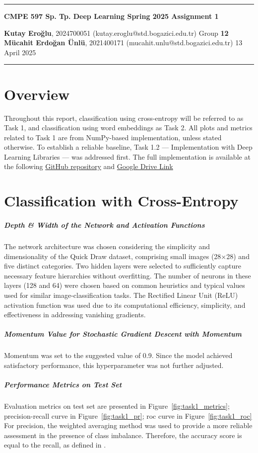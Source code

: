 \documentclass[10pt,a4paper,twoside]{article}
\begin{document}
\begin{center}
\hrule

\vspace{.4cm}
{\bf {\Huge CMPE 597 Sp. Tp. Deep Learning Spring 2025 Assignment 1}}
\vspace{.2cm}
\end{center}
{\bf Kutay Eroğlu}, 2024700051 (kutay.eroglu@std.bogazici.edu.tr)  \hspace{\fill} Group {\bf 12} \\
{\bf Mücahit Erdoğan Ünlü}, 2021400171 (mucahit.unlu@std.bogazici.edu.tr) \hspace{\fill} 13 April 2025 \\
\hrule

\section{Overview}
Throughout this report, classification using cross-entropy will be referred to as Task 1, and classification using word embeddings as Task 2. All plots and metrics related to Task 1 are from NumPy-based implementation, unless stated otherwise.
To establish a reliable baseline, Task 1.2 — Implementation with Deep Learning Libraries — was addressed first. The full implementation is available at the following \href{https://github.com/kutayeroglu/deep-learning}{GitHub repository} and \href{https://drive.google.com/file/d/1zl6N5mgoxoI37qVwYcb3n37ssTL8Q76D/view?usp=sharing}{Google Drive Link}


\section{Classification with Cross-Entropy}
\subparagraph{Depth \& Width of the Network and Activation Functions}
The network architecture was chosen considering the simplicity and dimensionality of the Quick Draw dataset, comprising small images (28×28) and five distinct categories. Two hidden layers were selected to sufficiently capture necessary feature hierarchies without overfitting. The number of neurons in these layers (128 and 64) were chosen based on common heuristics and typical values used for similar image-classification tasks. The Rectified Linear Unit (ReLU) activation function was used due to its computational efficiency, simplicity, and effectiveness in addressing vanishing gradients.
\subparagraph{Momentum Value for Stochastic Gradient Descent with Momentum}
Momentum was set to the suggested value of 0.9. Since the model achieved satisfactory performance, this hyperparameter was not further adjusted.
\subparagraph{Performance Metrics on Test Set}
Evaluation metrics on test set are presented in Figure~\ref{fig:task1_metrics}; precision-recall curve in Figure~\ref{fig:task1_pr}; roc curve in Figure~\ref{fig:task1_roc}
For precision, the weighted averaging method was used to provide a more reliable assessment in the presence of class imbalance.
Therefore, the accuracy score is equal to the recall, as defined in \cite{sklearn_recall}. 
\end{document}
